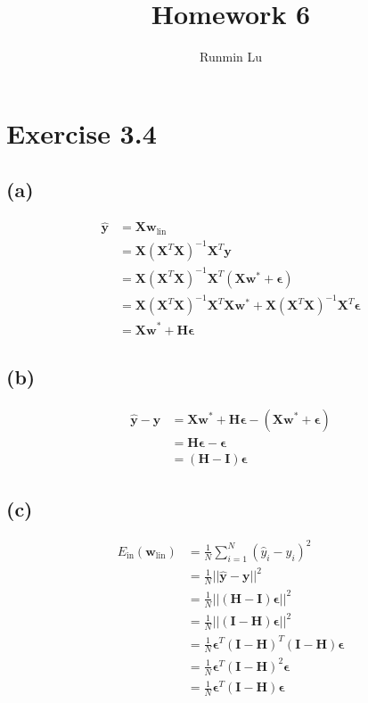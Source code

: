 \documentclass{article}
\title{Homework 6}
\author{Runmin Lu}
\begin{document}
	\maketitle
	
	\section*{Exercise 3.4}
	\subsection*{(a)}
		\begin{align*}
			\hat{\mathbf y} &= \mathbf X \mathbf w_{\text{lin}}\\
			&= \mathbf X(\mathbf X^T\mathbf X)^{-1}\mathbf X^T\mathbf y\\
			&= \mathbf X(\mathbf X^T\mathbf X)^{-1}\mathbf X^T(\mathbf X\mathbf w^* + \bm\epsilon)\\
			&= \mathbf X(\mathbf X^T\mathbf X)^{-1}\mathbf X^T\mathbf X\mathbf w^* + \mathbf X(\mathbf X^T\mathbf X)^{-1}\mathbf X^T \bm\epsilon\\
			&= \mathbf{Xw}^* + \mathbf H\bm\epsilon
		\end{align*}
	\subsection*{(b)}
		\begin{align*}
			\hat{\mathbf y} - \mathbf y &= \mathbf{Xw}^* + \mathbf H\bm\epsilon - (\mathbf{Xw}^* + \bm\epsilon)\\
			 &= \mathbf H\bm\epsilon - \bm\epsilon\\
			 &= (\mathbf H - \mathbf I)\bm\epsilon
		\end{align*}
	\subsection*{(c)}
		\begin{align*}
			E_\text{in}(\mathbf w_{\text{lin}}) &= \frac1N\sum\limits_{i=1}^N(\hat y_i - y_i)^2\\
			&= \frac1N||\hat{\mathbf y} - \mathbf y||^2\\
			&= \frac1N||(\mathbf H - \mathbf I)\bm\epsilon||^2\\
			&= \frac1N||(\mathbf I - \mathbf H)\bm\epsilon||^2\\
			&= \frac1N\bm\epsilon^T(\mathbf I - \mathbf H)^T(\mathbf I - \mathbf H)\bm\epsilon\\
			&= \frac1N\bm\epsilon^T(\mathbf I - \mathbf H)^2\bm\epsilon\\
			&= \frac1N\bm\epsilon^T(\mathbf I - \mathbf H)\bm\epsilon\\
		\end{align*}
		
\end{document}
